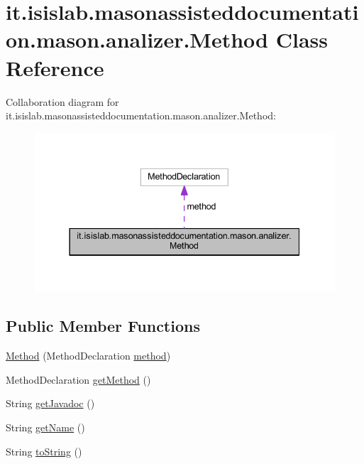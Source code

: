 \hypertarget{classit_1_1isislab_1_1masonassisteddocumentation_1_1mason_1_1analizer_1_1_method}{\section{it.\-isislab.\-masonassisteddocumentation.\-mason.\-analizer.\-Method Class Reference}
\label{classit_1_1isislab_1_1masonassisteddocumentation_1_1mason_1_1analizer_1_1_method}
}


Collaboration diagram for it.\-isislab.\-masonassisteddocumentation.\-mason.\-analizer.\-Method\-:
\nopagebreak
\begin{figure}[H]
\begin{center}
\leavevmode
\includegraphics[width=337pt]{classit_1_1isislab_1_1masonassisteddocumentation_1_1mason_1_1analizer_1_1_method__coll__graph}
\end{center}
\end{figure}
\subsection*{Public Member Functions}
\begin{DoxyCompactItemize}
\item 
\hyperlink{classit_1_1isislab_1_1masonassisteddocumentation_1_1mason_1_1analizer_1_1_method_a757ff14fb55a88bf5e27c4af55e4d1b4}{Method} (Method\-Declaration \hyperlink{classit_1_1isislab_1_1masonassisteddocumentation_1_1mason_1_1analizer_1_1_method_a90dcaceeda469988d15bfb9c5bbb8487}{method})
\item 
Method\-Declaration \hyperlink{classit_1_1isislab_1_1masonassisteddocumentation_1_1mason_1_1analizer_1_1_method_a8d2f7bfdb9e487a2564d8ebe46bc946e}{get\-Method} ()
\item 
String \hyperlink{classit_1_1isislab_1_1masonassisteddocumentation_1_1mason_1_1analizer_1_1_method_a04c17c96931db2403fb5a5eca7d3837b}{get\-Javadoc} ()
\item 
String \hyperlink{classit_1_1isislab_1_1masonassisteddocumentation_1_1mason_1_1analizer_1_1_method_a87c28d457164a753322c0849ba2bc981}{get\-Name} ()
\item 
String \hyperlink{classit_1_1isislab_1_1masonassisteddocumentation_1_1mason_1_1analizer_1_1_method_ae68759230dfc5543fd98bfaba0c4d4a9}{to\-String} ()
\end{DoxyCompactItemize}
